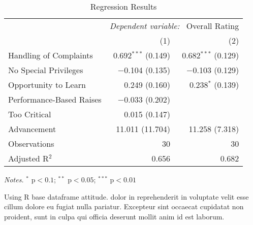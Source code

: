 \documentclass[12pt]{article}
\begin{document}
\begin{table}[tb]
  \caption{Regression Results}
  \label{tab:reg1}

  \begin{adjustbox}{center}
    \begin{threeparttable}
      \begin{tabular}{@{}
          lrr
          @{}}

        \toprule
        & \multicolumn{2}{c}{\textit{Dependent variable:} \ Overall Rating} \\
        \cmidrule{2-3}
                                 & (1)                   & (2)                   \\
        \hline

        Handling of Complaints   & 0.692$^{***}$ (0.149) & 0.682$^{***}$ (0.129) \\
        No Special Privileges    & $-$0.104 (0.135)      & $-$0.103 (0.129)      \\
        Opportunity to Learn     & 0.249 (0.160)         & 0.238$^{*}$ (0.139)   \\
        Performance-Based Raises & $-$0.033 (0.202)      &                       \\
        Too Critical             & 0.015 (0.147)         &                       \\
        Advancement              & 11.011 (11.704)       & 11.258 (7.318)        \\
        \hline
        Observations             & 30                    & 30                    \\
        Adjusted R$^{2}$         & 0.656                 & 0.682                 \\

        \bottomrule
      \end{tabular}

      \begin{tablenotes}\setlength{}\small
        \item {\small \textit{Notes.} $^{*}$ p$< 0.1$; $^{**}$ p$< 0.05$; $^{***}$ p$< 0.01$}
        \item {\small Using R base dataframe attitude. dolor in reprehenderit in voluptate velit esse cillum dolore eu fugiat nulla pariatur. Excepteur sint occaecat cupidatat non proident, sunt in culpa qui officia deserunt mollit anim id est laborum. }
      \end{tablenotes}
    \end{threeparttable}
  \end{adjustbox}
\end{table}
\end{document}
